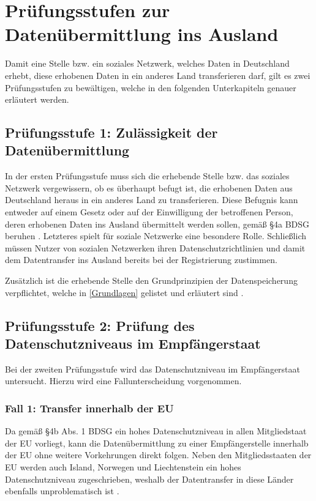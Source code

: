 \section{Prüfungsstufen zur Datenübermittlung ins Ausland}
Damit eine Stelle bzw. ein soziales Netzwerk, welches Daten in Deutschland erhebt, diese erhobenen Daten in ein anderes Land transferieren darf, gilt es zwei Prüfungsstufen zu bewältigen, welche in den folgenden Unterkapiteln genauer erläutert werden.

\subsection{Prüfungsstufe 1: Zulässigkeit der Datenübermittlung}
In der ersten Prüfungsstufe muss sich die erhebende Stelle bzw. das soziales Netzwerk vergewissern, ob es überhaupt befugt ist, die erhobenen Daten aus Deutschland heraus in ein anderes Land zu transferieren. Diese Befugnis kann entweder auf einem Gesetz oder auf der Einwilligung der betroffenen Person, deren erhobenen Daten ins Ausland übermittelt werden sollen, gemäß §4a BDSG beruhen \autocite[vgl.][]{LDI.2017}. Letzteres spielt für soziale Netzwerke eine besondere Rolle. Schließlich müssen Nutzer von sozialen Netzwerken ihren Datenschutzrichtlinien und damit dem Datentransfer ins Ausland bereits bei der Registrierung zustimmen.
\par
Zusätzlich ist die erhebende Stelle den Grundprinzipien der Datenspeicherung verpflichtet, welche in \vref{Grundlagen} gelistet und erläutert sind \autocite[vgl.][]{LDI.2017}.

\subsection{Prüfungsstufe 2: Prüfung des Datenschutzniveaus im Empfängerstaat}
Bei der zweiten Prüfungsstufe wird das Datenschutzniveau im Empfängerstaat untersucht. Hierzu wird eine Fallunterscheidung vorgenommen.

\subsubsection{Fall 1: Transfer innerhalb der EU}
Da gemäß §4b Abs. 1 BDSG ein hohes Datenschutzniveau in allen Mitgliedstaat der \acl{EU} vorliegt, kann die Datenübermittlung zu einer Empfängerstelle innerhalb der \acl{EU} ohne weitere Vorkehrungen direkt folgen. Neben den Mitgliedsstaaten der \ac{EU} werden auch Island, Norwegen und Liechtenstein ein hohes Datenschutzniveau zugeschrieben, weshalb der Datentransfer in diese Länder ebenfalls unproblematisch ist \autocite[vgl.][]{LDI.2017}.

